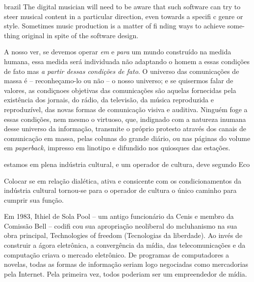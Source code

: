 \begin{otherlanguage*}{brazil}
The digital musician will need to be aware that such software can try to steer musical content in a particular direction, even towards a specifi c genre or style. Sometimes music production is a matter of fi nding ways to achieve some- thing original in spite of the software design. \cite[195]{Hugill2012}


\begin{citacao}
A nosso ver, se devemos operar \emph{em} e \emph{para} um mundo construído na medida humana, essa medida será individuada não adaptando o homem a essas condições de fato mas \emph{a partir dessas condições de fato}. O universo das comunicações de massa é -- reconheçamo-lo ou não -- o nosso universo; e se quisermos falar de valores, as condiçnoes objetivas das comunicações são aquelas fornecidas pela existência dos jornais, do rádio, da televisão, da música reproduzida e reproduzível, das novas formas de comunicação visiva e auditiva. Ninguém foge a essas condições, nem mesmo o virtuoso, que, indignado com a natureza inumana desse universo da informação, transmite o próprio protesto através dos canais de comunicação em massa, pelas colunas do grande diário, ou nas páginas do volume em \emph{paperback}, impresso em linotipo e difundido nos quiosques das estações.\cite[13]{Eco1970}


\end{citacao}

estamos em plena indústria cultural, e um operador de cultura, deve segundo Eco
\begin{citacao}
Colocar se em relação dialética, ativa e consicente com os condicionamentos da indústria cultural tornou-se para o operador de cultura o único caminho para cumprir sua função. \cite[14]{Eco1970}
\end{citacao}

\begin{citacao}
Em 1983, Ithiel de Sola Pool – um antigo funcionário da Cenis e membro da Comissão Bell – codifi cou sua apropriação neoliberal do mcluhanismo na sua obra principal, Technologies of freedom (Tecnologias da liberdade). Ao invés de construir a ágora eletrônica, a convergência da mídia, das telecomunicações e da computação criava o mercado eletrônico. De programas de computadores a novelas, todas as formas de informação seriam logo negociadas como mercadorias pela Internet. Pela primeira vez, todos poderiam ser um empreendedor de mídia. \cite[348]{Barbrook2009}
\end{citacao}

\begin{citacao}


\end{citacao}
\end{otherlanguage*}
